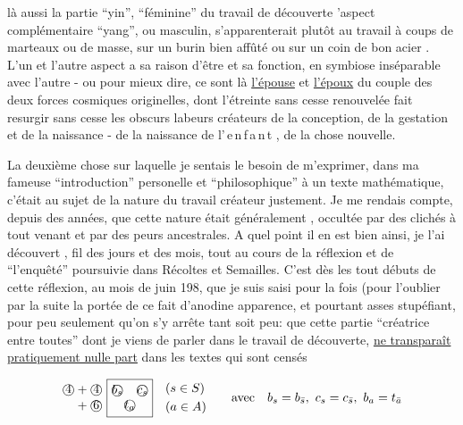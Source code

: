  là aussi la partie  ``yin'', ``féminine\deleted{\unsure{,}}'' du travail de découverte\deleted{-}  'aspect complémentaire ``yang'', ou masculin, s'apparenterait plutôt  au travail à coups de marteaux ou de masse, sur un burin bien affûté ou sur un coin de bon acier . L'un et l'autre aspect a sa raison d'être et sa fonction, en symbiose inséparable  avec l'autre - ou pour mieux dire, ce sont là \uline{l'épouse} et \uline{l'époux} du couple des deux forces cosmiques originelles, dont l'étreinte  sans cesse renouvelée fait resurgir sans cesse les obscurs labeurs créateurs de la conception, de la gestation et de la naissance - de la naissance de \mbox{l'\,e\,n\,f\,a\,n\,t} , de la chose nouvelle.

La deuxième chose sur laquelle je sentais le besoin de m'exprimer, dans ma fameuse ``introduction''  personelle et ``philosophique'' à un texte mathématique, c'était au sujet de la nature du travail créateur justement. Je me rendais compte, depuis des années, que cette nature était généralement , occultée par des clichés à tout venant et par des  peurs ancestrales. A quel point il en est bien ainsi, je l'ai découvert  ,  fil des jours et des mois, tout au cours de la réflexion et de ``l'enquêté'' poursuivie dans Récoltes et Semailles. C'est dès les tout débuts de cette réflexion, au mois de juin 198, que je suis saisi pour la  fois (pour l'oublier  par la suite\handwritten{,}  la portée de ce fait d'anodine apparence, et pourtant asses stupéfiant, pour peu seulement qu'on s'y arrête tant soit peu: que cette partie ``créatrice entre toutes'' dont je viens de parler dans le travail de découverte, \uline{ne transparaît pratiquement nulle part} dans les textes  qui sont censés

\[
 \begin{aligned}
 &\text{\textcircled{4}}+\text{\textcircled{4}}\\[-2pt]
 &\quad+\text{\textcircled{6}}
 \end{aligned}
 \ \boxed{\begin{matrix}\text{\textcircled{$b_s$}}&\text{\textcircled{$c_s$}}\\
 \multicolumn{2}{c}{\text{\textcircled{$t_a$}}}\end{matrix}}
 \quad\begin{aligned}&(s\in S)\\ &(a\in A)\end{aligned}
 \qquad \text{avec}\quad b_s=b_{\bar s},\ c_s=c_{\bar s},\ b_a=t_{\bar a}
\]

